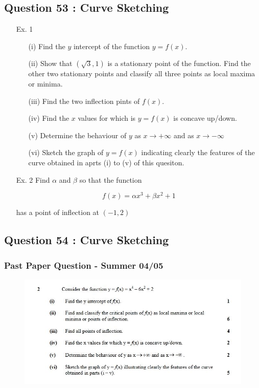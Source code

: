 \documentclass[]{article}
\begin{document}
\subsection*{Question 53 : Curve Sketching}
\begin{itemize}
	\item[Ex. 1]
	\begin{itemize}
		\item[(i)] Find the $y$ intercept of the function $y=f(x)$.
		\item[(ii)] Show that $(\sqrt{3},1)$ is a stationary point of the function. Find the other two stationary points and classify all
		three points as local maxima or minima.
		\item[(iii)] Find the two inflection pints of $f(x)$.
		\item[(iv)] Find the $x$ values for which is $y=f(x)$ is concave up/down.
		\item[(v)] Determine the behaviour of $y$ as $x \rightarrow + \infty$ and as $x \rightarrow -\infty$ 
		\item[(vi)] Sketch the graph of $y = f(x)$ indicating clearly the features of the curve obtained in aprts (i) to (v) of this quesiton.
	\end{itemize}
	
	
	\item[Ex. 2] Find $\alpha$ and $\beta$ so that the function 
	
	\begin{displaymath}f(x) = \alpha x^3 + \beta x^2+1\end{displaymath}
	
	has a point of inflection at  $\displaystyle \left(-1,2\right)$
\end{itemize}



\subsection*{Question 54 : Curve Sketching}
\subsubsection*{Past Paper Question -  Summer 04/05}
\begin{figure}[h!]
	\centering
	\includegraphics[width=0.87\linewidth]{curvesketching0405}
	
\end{figure}
\end{document}
